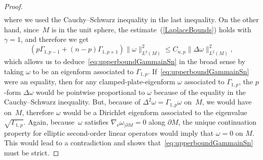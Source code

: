 \documentclass[pdftex]{sigma}
\numberwithin{equation}{section}
\theoremstyle{definition}
\begin{document}
\begin{proof}
\begin{align*}
\end{align*}
where we used the Cauchy--Schwarz inequality in the last inequality. On the other hand, since~$M$ is in the unit sphere, the estimate~(\ref{LaplaceBounds}) holds with $\gamma=1$, and therefore we get
\[
 (p \Gamma_{1,p-1}+ (n-p) \Gamma_{1,p+1} )\|\omega\|^2_{L^2(M)}\leq C_{n,p}\|\Delta\omega\|^2_{L^2(M)},
\]
which allows us to deduce~\eqref{eq:upperboundGammainSn} in the broad sense by taking $\omega$ to be an eigenform associated to $\Gamma_{1,p}$.
If~\eqref{eq:upperboundGammainSn} were an equality, then for any clamped-plate-eigenform $\omega$ associated to $\Gamma_{1,p}$, the $p$-form $\Delta\omega$ would be pointwise proportional to $\omega$ because of the equality in the Cauchy--Schwarz inequality. But, because of $\Delta^2\omega=\Gamma_{1,p}\omega$ on~$M$, we would have  on~$M$, therefore $\omega$ would be a Dirichlet eigenform associated to the eigenvalue $\sqrt{\Gamma_{1,p}}$.
Again, because~$\omega$ satisfies $\nabla_\nu\omega_{|\partial M}=0$ along $\partial M$, the unique continuation property for elliptic second-order linear operators would imply that $\omega=0$ on $M$.
This would lead to a contradiction and shows that~\eqref{eq:upperboundGammainSn} must be strict.


\end{proof}
\end{document}
